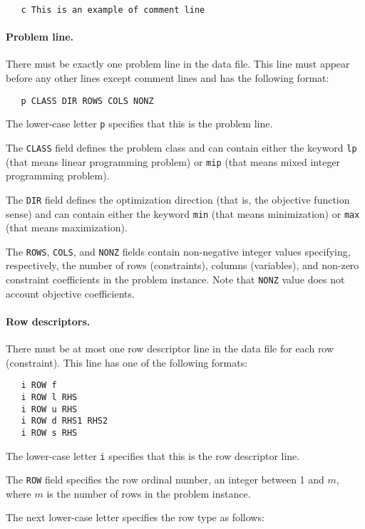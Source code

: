 \begin{verbatim}
   c This is an example of comment line
\end{verbatim}

\paragraph{Problem line.} There must be exactly one problem line in the
data file. This line must appear before any other lines except comment
lines and has the following format:

\begin{verbatim}
   p CLASS DIR ROWS COLS NONZ
\end{verbatim}

The lower-case letter \verb|p| specifies that this is the problem line.

The \verb|CLASS| field defines the problem class and can contain either
the keyword \verb|lp| (that means linear programming problem) or
\verb|mip| (that means mixed integer programming problem).

The \verb|DIR| field defines the optimization direction (that is, the
objective function sense) and can contain either the keyword \verb|min|
(that means minimization) or \verb|max| (that means maximization).

The \verb|ROWS|, \verb|COLS|, and \verb|NONZ| fields contain
non-negative integer values specifying, respectively, the number of
rows (constraints), columns (variables), and non-zero constraint
coefficients in the problem instance. Note that \verb|NONZ| value does
not account objective coefficients.

\paragraph{Row descriptors.} There must be at most one row descriptor
line in the data file for each row (constraint). This line has one of
the following formats:

\begin{verbatim}
   i ROW f
   i ROW l RHS
   i ROW u RHS
   i ROW d RHS1 RHS2
   i ROW s RHS
\end{verbatim}

The lower-case letter \verb|i| specifies that this is the row
descriptor line.

The \verb|ROW| field specifies the row ordinal number, an integer
between 1 and $m$, where $m$ is the number of rows in the problem
instance.

The next lower-case letter specifies the row type as follows:

